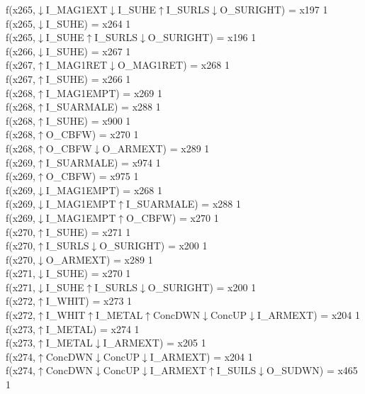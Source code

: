 f(x265,$\downarrow$I\_MAG1EXT$\downarrow$I\_SUHE$\uparrow$I\_SURLS$\downarrow$O\_SURIGHT) = x197 {1} \\
f(x265,$\downarrow$I\_SUHE) = x264 {1} \\
f(x265,$\downarrow$I\_SUHE$\uparrow$I\_SURLS$\downarrow$O\_SURIGHT) = x196 {1} \\
f(x266,$\downarrow$I\_SUHE) = x267 {1} \\
f(x267,$\uparrow$I\_MAG1RET$\downarrow$O\_MAG1RET) = x268 {1} \\
f(x267,$\uparrow$I\_SUHE) = x266 {1} \\
f(x268,$\uparrow$I\_MAG1EMPT) = x269 {1} \\
f(x268,$\uparrow$I\_SUARMALE) = x288 {1} \\
f(x268,$\uparrow$I\_SUHE) = x900 {1} \\
f(x268,$\uparrow$O\_CBFW) = x270 {1} \\
f(x268,$\uparrow$O\_CBFW$\downarrow$O\_ARMEXT) = x289 {1} \\
f(x269,$\uparrow$I\_SUARMALE) = x974 {1} \\
f(x269,$\uparrow$O\_CBFW) = x975 {1} \\
f(x269,$\downarrow$I\_MAG1EMPT) = x268 {1} \\
f(x269,$\downarrow$I\_MAG1EMPT$\uparrow$I\_SUARMALE) = x288 {1} \\
f(x269,$\downarrow$I\_MAG1EMPT$\uparrow$O\_CBFW) = x270 {1} \\
f(x270,$\uparrow$I\_SUHE) = x271 {1} \\
f(x270,$\uparrow$I\_SURLS$\downarrow$O\_SURIGHT) = x200 {1} \\
f(x270,$\downarrow$O\_ARMEXT) = x289 {1} \\
f(x271,$\downarrow$I\_SUHE) = x270 {1} \\
f(x271,$\downarrow$I\_SUHE$\uparrow$I\_SURLS$\downarrow$O\_SURIGHT) = x200 {1} \\
f(x272,$\uparrow$I\_WHIT) = x273 {1} \\
f(x272,$\uparrow$I\_WHIT$\uparrow$I\_METAL$\uparrow$ConcDWN$\downarrow$ConcUP$\downarrow$I\_ARMEXT) = x204 {1} \\
f(x273,$\uparrow$I\_METAL) = x274 {1} \\
f(x273,$\uparrow$I\_METAL$\downarrow$I\_ARMEXT) = x205 {1} \\
f(x274,$\uparrow$ConcDWN$\downarrow$ConcUP$\downarrow$I\_ARMEXT) = x204 {1} \\
f(x274,$\uparrow$ConcDWN$\downarrow$ConcUP$\downarrow$I\_ARMEXT$\uparrow$I\_SUILS$\downarrow$O\_SUDWN) = x465 {1} \\
